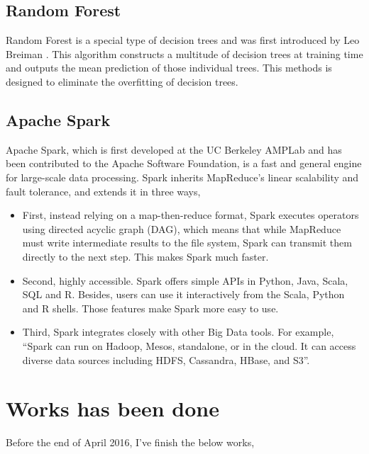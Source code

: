\documentclass[12pt,a4paper]{scrartcl}
\begin{document}
	\subsection{Random Forest}
	Random Forest is a special type of decision trees and was first introduced by Leo Breiman \cite{breiman2001random}. This algorithm constructs a multitude of decision trees at training time and outputs the mean prediction of those individual trees. This methods is designed to eliminate the overfitting of decision trees.
	\subsection{Apache Spark}
	Apache Spark, which is first developed at the UC Berkeley AMPLab and has been contributed to the Apache Software Foundation, is a fast and general engine for large-scale data processing\cite{ryza2015advanced}. Spark inherits MapReduce's linear scalability and fault tolerance, and extends it in three ways,
	\begin{itemize}
		\item First, instead relying on a map-then-reduce format, Spark executes operators using directed acyclic graph (DAG), which means that while MapReduce must write intermediate results to the file system, Spark can transmit them directly to the next step. This makes Spark much faster.
		\item Second, highly accessible. Spark offers simple APIs in Python, Java, Scala, SQL and R. Besides, users can use it interactively from the Scala, Python and R shells. Those features make Spark more easy to use.
		\item Third, Spark integrates closely with other Big Data tools. For example, \enquote{Spark can run on Hadoop, Mesos, standalone, or in the cloud. It can access diverse data sources including HDFS, Cassandra, HBase, and S3}\cite{apache_spark}.
	\end{itemize}
	\section{Works has been done}
	Before the end of April 2016, I've finish the below works,
\end{document}
